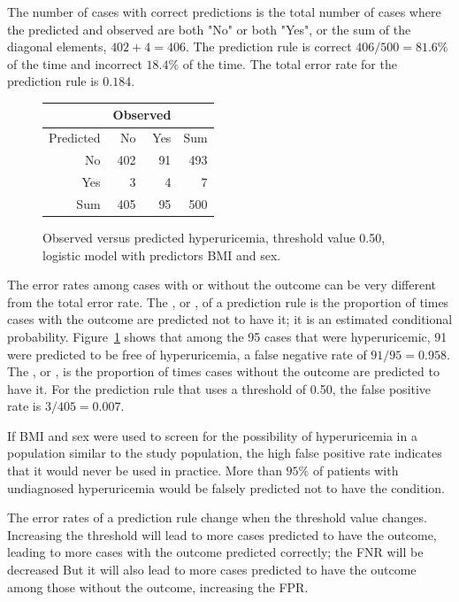 The number of cases with correct predictions is the total number of cases where the predicted and observed are both "No" or both "Yes", or the sum of the diagonal elements, $402 + 4 = 406$.  The prediction rule is correct $406/500 = 81.6\%$ of the time and 
incorrect $18.4\%$ of the time.  The total error rate for the prediction rule is $0.184$.

\begin{figure}[ht]
\centering
\begin{tabular}{rrrr}
  \hline
  & \multicolumn{2}{c}{Observed} & \\
  \hline
 Predicted& No & Yes & Sum \\ 
  \hline
No & 402 & 91 & 493 \\ 
Yes & 3 & 4 & 7 \\ 
  Sum & 405 & 95 & 500 \\ 
   \hline
\end{tabular}
\caption{Observed versus predicted hyperuricemia, 
       threshold value 0.50, logistic model with predictors BMI and sex.} 
\label{figure:predVsObsHuBMISex}
\end{figure}

The error rates among cases with or without the outcome can be very different from the total error rate. The , or , of a prediction rule is the proportion of times cases with the outcome are predicted not to have it; it is an estimated conditional probability.  Figure~\ref{figure:predVsObsHuBMISex} shows that among the 95 cases that were hyperuricemic, 91 were predicted to be free of hyperuricemia, a false negative rate of $91/95 = 0.958$. The , or , is the proportion of times cases without the outcome are predicted to have it. For the prediction rule that uses a threshold of 0.50, the false positive rate is $3/405 = 0.007$.   

If BMI and sex were used to screen for the possibility of hyperuricemia in a population similar to the study population, the high false positive rate indicates that it would never be used in practice.  More than $95\%$ of patients with undiagnosed hyperuricemia would be falsely predicted not to have the condition.

The error rates of a prediction rule change when the threshold value changes.  Increasing the threshold will lead to more cases predicted to have the outcome, leading to more cases with the outcome predicted correctly;  the FNR will be decreased  But it will also lead to more cases predicted to have the outcome among those without the outcome, increasing the FPR.

